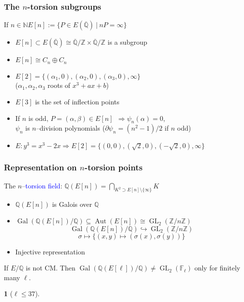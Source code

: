 \documentclass[10pt,handout]{beamer} %
\newcommand{\Q}{\mathbb Q}
\newcommand{\Z}{\mathbb Z}
\newcommand{\N}{\mathbb N}
\newcommand{\F}{\mathbb F}
\theoremstyle{definition}
\newtheorem{conj}[theorem]{\translate{Conjecture}}
\begin{document}
\begin{frame}
\frametitle{The $n$-torsion subgroups}\pause

\begin{block}
{If $n\in\N$\hspace{2cm}$E[n]:=\{P\in E(\overline{\Q})\ |\ nP=\infty\}$ }\pause
\begin{itemize}[<+-| alert@+>]
\item $E[n]\subset E(\overline{\Q})\cong \overline{\Q}/\Z\times \overline{\Q}/\Z$ is a subgroup
\item $E[n]\cong C_n\oplus C_n$
\item $E[2]=\{ (\alpha_1,0), (\alpha_2,0), (\alpha_3,0), \infty\}$\\
($\alpha_1, \alpha_2, \alpha_3$ roots of $x^3+ax+b$)
\item $E[3]$ is the set of inflection points
\item If $n$ is odd, $P=(\alpha,\beta)\in E[n]\ \ \Longrightarrow \psi_n(\alpha)=0$,\\
$\psi_n$ is $n$--division polynomials ($\partial \psi_n=(n^2-1)/2$ if $n$ odd)
\item
$E: y^3=x^3-2x\Longrightarrow E[2]=\{(0,0), (\sqrt{2},0), (-\sqrt{2},0), \infty\}$
\end{itemize}\pause
\end{block}
\end{frame}

\begin{frame}
\frametitle{Representation on $n$-torsion points}


\begin{block}{The $n$--\textcolor{blue}{torsion field}:
\hfill $\Q(E[n])=\displaystyle{\bigcap_{K^2 \supset E[n]\setminus\{\infty\}}} K$}\pause
\begin{itemize}[<+-| alert@+>]
\item $\Q(E[n])$ is Galois over $\Q$
\item $\operatorname{Gal}(\Q(E[n])/\Q)\subseteq\operatorname{Aut}(E[n])\cong \operatorname{GL}_2(\Z/n\Z)$
$$\operatorname{Gal}(\Q(E[n])/\Q)\hookrightarrow \operatorname{GL}_2(\Z/n\Z)$$
$$ \sigma\mapsto \{(x,y)\mapsto (\sigma(x),\sigma(y))\}$$
\item[] Injective representation
\end{itemize}
\end{block}\pause

\begin{theorem}[Serre]\pause If $E/\Q$ is not CM. Then
$\operatorname{Gal}(\Q(E[\ell])/\Q)\neq \operatorname{GL}_2(\F_\ell)$
only for finitely many $\ell$. 
\end{theorem}\pause

\begin{conj}[$\ell\le 37$]
 \end{conj}

\end{frame}
\end{document}

